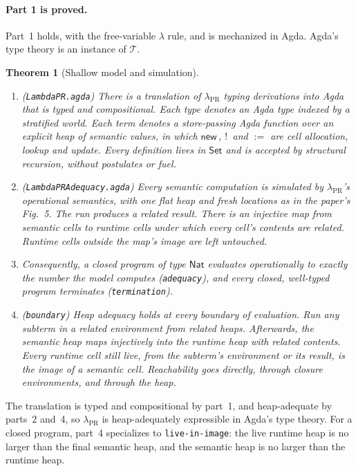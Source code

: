 \documentclass[11pt]{article}
\newtheorem{theorem}{Theorem}
\theoremstyle{remark}
\newcommand{\lpr}{\lambda_{\mathrm{PR}}}
\newcommand{\Nat}{\mathsf{Nat}}
\newcommand{\new}{\mathsf{new}\,}
\newcommand{\deref}{!\,}
\newcommand{\assign}{\mathrel{:=}}
\begin{document}
\paragraph{Part 1 is proved.}
Part~1 holds, with the free-variable $\lambda$ rule, and is mechanized in
Agda. Agda's type theory is an instance of $\mathcal{T}$.

\begin{theorem}[Shallow model and simulation]
  \leavevmode
  \begin{enumerate}
    \item (\texttt{LambdaPR.agda}) There is a translation of $\lpr$ typing
      derivations into Agda that is typed and compositional. Each type denotes
      an Agda type indexed by a stratified world. Each term denotes a
      store-passing Agda function over an explicit heap of semantic values,
      in which $\new$, $\deref$ and $\assign$ are cell allocation, lookup and
      update. Every definition lives in $\mathsf{Set}$ and is accepted by
      structural recursion, without postulates or fuel.
    \item (\texttt{LambdaPRAdequacy.agda}) Every semantic computation is
      simulated by $\lpr$'s operational semantics, with one flat heap and
      fresh locations as in the paper's Fig.~5. The run produces a related
      result. There is an injective map from semantic cells to runtime cells
      under which every cell's contents are related. Runtime cells outside the
      map's image are left untouched.
    \item Consequently, a closed program of type $\Nat$ evaluates
      operationally to exactly the number the model computes
      (\texttt{adequacy}), and every closed, well-typed program terminates
      (\texttt{termination}).
    \item (\texttt{boundary}) Heap adequacy holds at every boundary of
      evaluation. Run any subterm in a related environment from related
      heaps. Afterwards, the semantic heap maps injectively into the runtime
      heap with related contents. Every runtime cell still live, from the
      subterm's environment or its result, is the image of a semantic cell.
      Reachability goes directly, through closure environments, and through
      the heap.
  \end{enumerate}
\end{theorem}

The translation is typed and compositional by part~1, and heap-adequate by
parts~2 and~4, so $\lpr$ is heap-adequately expressible in Agda's type
theory. For a closed program, part~4 specializes to
\texttt{live-in-image}: the live runtime heap is no larger than the final
semantic heap, and the semantic heap is no larger than the runtime heap.
\end{document}
